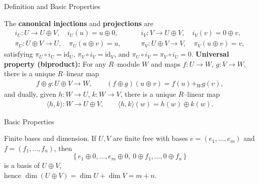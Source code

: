 \begin{frame}{Definition and Basic Properties}
\begin{block}{}
The \textbf{canonical injections} and \textbf{projections} are
\small\begin{align*}
i_U:U\to U\oplus V,\quad i_U(u)=u\oplus 0, \qquad &
i_V:V\to U\oplus V,\quad i_V(v)=0\oplus v,\\
\pi_U:U\oplus V\to U,\quad \pi_U(u\oplus v)=u, \qquad &
\pi_V:U\oplus V\to V,\quad \pi_V(u\oplus v)=v,
\end{align*}
satisfying $\pi_U\circ i_U=\mathrm{id}_U$, $\pi_V\circ i_V=\mathrm{id}_V$, and $\pi_U\circ i_V=\pi_V\circ i_U=0$.
\textbf{Universal property (biproduct):} For any $R$–module $W$ and maps $f:U\to W$, $g:V\to W$, there is a unique $R$–linear map
\begin{align*}
f\oplus g:U\oplus V\to W,\qquad (f\oplus g)(u\oplus v)=f(u)+_W g(v),
\end{align*}
and dually, given $h:W\to U$, $k:W\to V$, there is a unique $R$–linear map
\begin{align*}
\langle h,k\rangle:W\to U\oplus V,\qquad \langle h,k\rangle(w)=h(w)\oplus k(w).
\end{align*}
\end{block}
\end{frame}

\begin{frame}{Basic Properties}
\begin{block}{Finite bases and dimension.} If $U,V$ are finite free with bases $e=(e_1,\dots,e_m)$ and $f=(f_1,\dots,f_n)$, then
\[
\{\,e_1\oplus 0,\dots, e_m\oplus 0,\ 0\oplus f_1,\dots,0\oplus f_n\,\}
\]
is a basis of $U\oplus V$, \\
hence $\dim(U\oplus V)=\dim U+\dim V=m+n$.
\end{block}
\end{frame}

